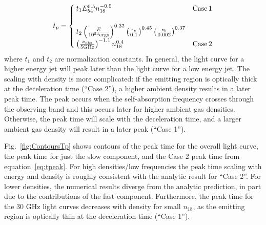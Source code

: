 \documentclass[usenatbib,fleqn]{mnras}
\begin{document}
\begin{align}
t_p=
\begin{cases}
  t_1 E_{54}^{0.5} n_{18}^{-0.5} & {\rm Case \, 1}\\\\
  t_2 \left(\frac{E}{10^{54} {\rm ergs}}\right)^{0.32}
  \left(\frac{\epsilon_e}{0.1}\right)^{0.45}
  \left(\frac{\epsilon_b}{0.002}\right)^{0.37}\\
  \left(\frac{\nu_{\rm obs}}{5 {\rm GHz}}\right)^{-1.1} n_{18}^{0.4} &
  {\rm Case \, 2}
\end{cases}
\label{eq:tpeak}
\end{align}
%
where $t_1$ and $t_2$ are normalization constants. In general, the
light curve for a higher energy jet will peak later than the light
curve for a low energy jet. The scaling with density is more
complicated: if the emitting region is optically thick at the
deceleration time (``Case 2''), a higher ambient density results in a
later peak time. The peak occurs when the self-absorption frequency
crosses through the observing band and this occurs later for higher
ambient gas densities. Otherwise, the peak time will scale with the
deceleration time, and a larger ambient gas density will result in a
later peak (``Case 1'').

Fig.~\ref{fig:ContoursTp} shows contours of the peak time for the
overall light curve, the peak time for just the slow component, and
the Case 2 peak time from equation~\eqref{eq:tpeak}. For high
densities/low frequencies the peak time scaling with energy and
density is roughly consistent with the analytic result for ``Case
2''. For lower densities, the numerical results diverge from the
analytic prediction, in part due to the contributions of the fast
component.  Furthermore, the peak time for the 30 GHz light curves
decreases with density for small $n_{18}$, as the emitting region is
optically thin at the deceleration time (``Case 1'').
\end{document}
